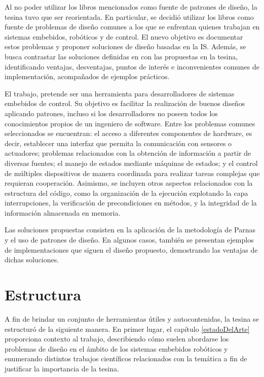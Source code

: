 Al no poder utilizar los libros mencionados como fuente de patrones de diseño, la tesina tuvo que ser reorientada. En particular, se decidió utilizar los libros como fuente de problemas de diseño comunes a los que se enfrentan quienes trabajan en sistemas embebidos, robóticos y de control. El nuevo objetivo es documentar estos problemas y proponer soluciones de diseño basadas en la IS. Además, se busca contrastar las soluciones definidas en \cite{douglass} con las propuestas en la tesina, identificando ventajas, desventajas, puntos de interés e inconvenientes comunes de implementación, acompañados de ejemplos prácticos.

El trabajo, pretende ser una herramienta para desarrolladores de sistemas embebidos de control. Su objetivo es facilitar la realización de buenos diseños aplicando patrones, incluso si los desarrolladores no poseen todos los conocimientos propios de un ingeniero de software. Entre los problemas comunes seleccionados se encuentran: el acceso a diferentes componentes de hardware, es decir, establecer una interfaz que permita la comunicación con sensores o actuadores; problemas relacionados con la obtención de información a partir de diversas fuentes; el manejo de estados mediante máquinas de estados; y el control de múltiples dispositivos de manera coordinada para realizar tareas complejas que requieran cooperación. Asimismo, se incluyen otros aspectos relacionados con la estructura del código, como la organización de la ejecución explotando la capa interrupciones, la verificación de precondiciones en métodos, y la integridad de la información almacenada en memoria.

Las soluciones propuestas consisten en la aplicación de la metodología de Parnas \cite{parnas72} y el uso de patrones de diseño. En algunos casos, también se presentan ejemplos de implementaciones que siguen el diseño propuesto, demostrando las ventajas de dichas soluciones.

\section*{Estructura}

A fin de brindar un conjunto de herramientas útiles y autocontenidas, la tesina se estructuró de la siguiente manera. En primer lugar, el capítulo \ref{estadoDelArte} proporciona contexto al trabajo, describiendo cómo suelen abordarse los problemas de diseño en el ámbito de los sistemas embebidos robóticos y enumerando distintos trabajos científicos relacionados con la temática a fin de justificar la importancia de la tesina.

